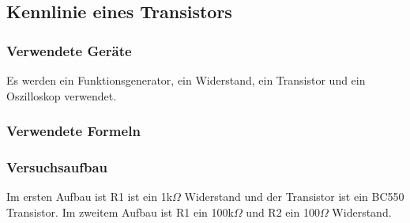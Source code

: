 \documentclass[12pt,a4paper]{article}
\begin{document}
\subsection{Kennlinie eines Transistors}
\subsubsection{Verwendete Geräte}

Es werden ein Funktionsgenerator, ein Widerstand, ein Transistor und ein Oszilloskop verwendet.

\subsubsection{Verwendete Formeln}
\subsubsection{Versuchsaufbau}

Im ersten Aufbau ist R1 ist ein 1k$\Omega$ Widerstand und der Transistor ist ein BC550 Transistor. Im zweitem Aufbau ist R1 ein 100k$\Omega$ und R2 ein 100$\Omega$ Widerstand.
\end{document}
